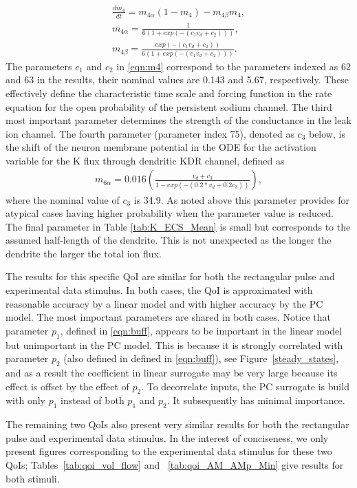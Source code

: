 \begin{eqnarray}\label{eqn:m4}
\frac{dm_4}{dt}=m_{4 \alpha}(1-m_4)-m_{4 \beta}m_4, \nonumber \\
m_{4 \alpha}=  \frac{1}{6(1 + exp(-(c_1  v_d + c_2)))},\nonumber \\
m_{4 \beta}= \frac{exp(-(c_1 v_d + c_2))}{6(1 + exp(-(c_1 v_d + c_2)))}.
\end{eqnarray}
The parameters $c_1$ and $c_2$ in \eqref{eqn:m4} correspond to the parameters indexed as 62 and 63 in the results, their nominal values are 0.143 and 5.67, respectively. These effectively define the characteristic time scale and forcing function in the rate equation for the open  probability of the persistent sodium channel. The third most important parameter determines the strength of the  conductance in the \pot leak ion channel. The fourth parameter (parameter index 75), denoted as $c_3$ below, is the shift of the neuron membrane potential in the ODE for the activation variable for the  K flux through dendritic KDR channel, defined as 
\begin{eqnarray}\label{eqn:m6}
m_{6  \alpha}     = 0.016 \left(\frac{v_d + c_3}{1 - exp(-(0.2 * v_d + 0.2c_3))} \right), 
\end{eqnarray}
where the nominal value of $c_3$ is 34.9. As noted above this parameter provides for atypical cases having higher probability when the parameter value is reduced. The final parameter in Table \ref{tab:K_ECS_Mean} is small but corresponds to the assumed half-length of the dendrite. This is not unexpected as the longer the dendrite the larger the total ion flux. 

The results for this specific QoI are similar for both the rectangular pulse and experimental data stimulus. In both cases, the QoI is approximated with reasonable accuracy by a linear model and with higher accuracy by the PC model. The most important parameters are shared in both cases. Notice that parameter $p_1$, defined in \eqref{eqn:buff}, appears to be important in the linear model but unimportant in the PC model. This is because it is strongly correlated with parameter $p_2$ (also defined in defined in \eqref{eqn:buff}), see Figure~\ref{steady_states}, and as a result the coefficient in linear surrogate may be very large because its effect is offset by the effect of $p_2$. To decorrelate inputs, the PC surrogate is build with only $p_1$ instead of both $p_1$ and $p_2$. It subsequently has minimal importance.

The remaining two QoIs also present very similar results for both the rectangular pulse and experimental data stimulus. In the interest of conciseness, we only present figures corresponding to the experimental data stimulus for these two QoIs; Tables~\ref{tab:qoi_vol_flow} and ~\ref{tab:qoi_AM_AMp_Min} give results for both stimuli. 

